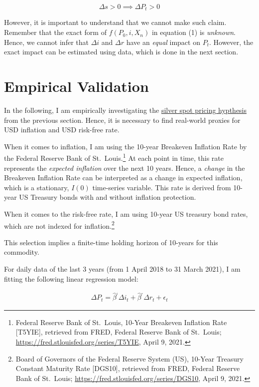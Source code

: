 \documentclass[
  12pt,
]{article}
\begin{document}
\[\Delta s >0 \implies \Delta P_t > 0\]

However, it is important to understand that we cannot make such claim.
Remember that the exact form of \(f(P_0, i, X_n)\) in equation (1) is
\emph{unknown}. Hence, we cannot infer that \(\Delta i\) and
\(\Delta r\) have an \emph{equal} impact on \(P_t\). However, the exact
impact can be estimated using data, which is done in the next section.

\hypertarget{empirical-validation}{%
\section{Empirical Validation}\label{empirical-validation}}

In the following, I am empirically investigating the
\protect\hyperlink{silver-spot-pricing-hypothesis}{silver spot pricing
hypthesis} from the previous section. Hence, it is necessary to find
real-world proxies for USD inflation and USD risk-free rate.

When it comes to inflation, I am using the 10-year Breakeven Inflation
Rate by the Federal Reserve Bank of St.~Louis.\footnote{Federal Reserve
  Bank of St.~Louis, 10-Year Breakeven Inflation Rate {[}T5YIE{]},
  retrieved from FRED, Federal Reserve Bank of St.~Louis;
  \url{https://fred.stlouisfed.org/series/T5YIE}, April 9, 2021.} At
each point in time, this rate represents the \emph{expected inflation}
over the next 10 years. Hence, a \emph{change} in the Breakeven
Inflation Rate can be interpreted as a change in expected inflation,
which is a stationary, \(I(0)\) time-series variable. This rate is
derived from 10-year US Treasury bonds with and without inflation
protection.

When it comes to the risk-free rate, I am using 10-year US treasury bond
rates, which are not indexed for inflation.\footnote{Board of Governors
  of the Federal Reserve System (US), 10-Year Treasury Constant Maturity
  Rate {[}DGS10{]}, retrieved from FRED, Federal Reserve Bank of
  St.~Louis; \url{https://fred.stlouisfed.org/series/DGS10}, April 9,
  2021.}

This selection implies a finite-time holding horizon of 10-years for
this commodity.

For daily data of the last 3 years (from 1 April 2018 to 31 March 2021),
I am fitting the following linear regression model:

\begin{align}
\Delta P_t = \hat\beta^{_i} \Delta i_t + \hat\beta^{_r} \Delta r_t + \epsilon_t
\end{align}
\end{document}
